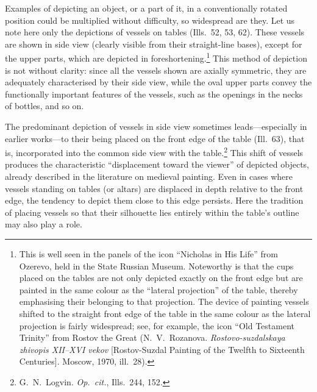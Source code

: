 Examples of depicting an object, or a part of it, in a conventionally rotated position
could be multiplied without difficulty, so widespread are they.  Let us note here only
the depictions of vessels on tables (Ills.~52, 53, 62).  These vessels are shown in side
view (clearly visible from their straight-line bases), except for the upper parts, which
are depicted in foreshortening.\footnote{This is well seen in the panels of the icon
  ``Nicholas in His Life'' from Ozerevo, held in the State Russian Museum.  Noteworthy
  is that the cups placed on the tables are not only depicted exactly on the front edge
  but are painted in the same colour as the ``lateral projection'' of the table, thereby
  emphasising their belonging to that projection.  The device of painting vessels shifted
  to the straight front edge of the table in the same colour as the lateral projection
  is fairly widespread; see, for example, the icon ``Old Testament Trinity'' from Rostov
  the Great (N.~V.~Rozanova.  \emph{Rostovo-suzdalskaya zhivopis XII--XVI vekov}
  [Rostov-Suzdal Painting of the Twelfth to Sixteenth Centuries].  Moscow, 1970,
  ill.~28).}  This method of depiction is not without clarity: since all the vessels
shown are axially symmetric, they are adequately characterised by their side view, while
the oval upper parts convey the functionally important features of the vessels, such as
the openings in the necks of bottles, and so on.


The predominant depiction of vessels in side view sometimes leads---especially in earlier
works---to their being placed on the front edge of the table (Ill.~63), that is,
incorporated into the common side view with the table.\footnote{G.~N.~Logvin.
  \emph{Op.~cit.}, Ills.~244, 152.}  This shift of vessels produces the characteristic
``displacement toward the viewer'' of depicted objects, already described in the
literature on medieval painting.  Even in cases where vessels standing on tables (or
altars) are displaced in depth relative to the front edge, the tendency to depict them
close to this edge persists.  Here the tradition of placing vessels so that their
silhouette lies entirely within the table's outline may also play a role.

